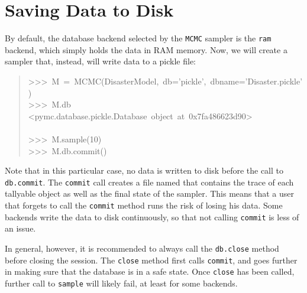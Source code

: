 
\hypertarget{saving-data-to-disk}{}
\section{Saving Data to Disk}
\label{saving-data-to-disk}

By default, the database backend selected by the \texttt{MCMC} sampler is the \texttt{ram}
backend, which simply holds the data in RAM memory. Now, we will create a
sampler that, instead, will write data to a pickle file:
\begin{quote}{\ttfamily \raggedright \noindent
>{}>{}>~M~=~MCMC(DisasterModel,~db='pickle',~dbname='Disaster.pickle')~\\
>{}>{}>~M.db~\\
<pymc.database.pickle.Database~object~at~0x7fa486623d90>~\\
~\\
>{}>{}>~M.sample(10)~\\
>{}>{}>~M.db.commit()
}\end{quote}

Note that in this particular case, no data is written to disk before the call
to \texttt{db.commit}. The \texttt{commit} call creates a file named 
that contains the trace of each tallyable object as well as the final state of
the sampler. This means that a user that forgets to call the \texttt{commit}
method runs the risk of losing his data. Some backends write the data to disk
continuously, so that not calling \texttt{commit} is less of an issue.

In general, however, it is recommended to always call the \texttt{db.close} method
before closing the session. The \texttt{close} method first calls \texttt{commit}, and
goes further in making sure that the database is in a safe state. Once \texttt{close}
has been called, further call to \texttt{sample} will likely fail, at least
for some backends.
\begin{center}\begin{sffamily}
\end{sffamily}
\end{center}


